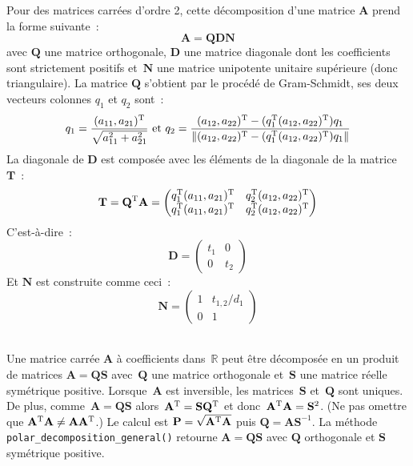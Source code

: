 \documentclass[11pt]{article}
\newcommand{\R}{\mathbf{\mathds{R}}}
\newcommand{\mb}[1]{\mathbf{#1}}
\let\mathds\mathbb
\begin{document}
\begin{description}[leftmargin=4cm, style=nextline]
\item[\texttt{iwasawa()}] 
Pour des matrices carr\'ees d'ordre 2, cette d\'ecomposition d'une matrice $\mb{A}$ prend la forme suivante~:
$$\mb{A} = \mb{Q}\mb{D}\mb{N}$$
avec $\mb{Q}$ une matrice orthogonale, $\mb{D}$ une matrice diagonale dont les coefficients sont strictement positifs et~$\mb{N}$ une matrice unipotente unitaire sup\'erieure (donc triangulaire).
La matrice $\mb{Q}$ s'obtient par le proc\'ed\'e de Gram-Schmidt, ses deux vecteurs colonnes $q_1$ et $q_2$ sont~:
$$q_1 = \dfrac{(a_{11},a_{21})^{\textsc{T}}}{\sqrt{a_{11}^2+a_{21}^2}} \text{ et } q_2 = \dfrac{(a_{12},a_{22})^{\textsc{T}}-(q_1^{\textsc{T}}(a_{12},a_{22})^{\textsc{T}})q_1}{\|(a_{12},a_{22})^{\textsc{T}}-(q_1^{\textsc{T}}(a_{12},a_{22})^{\textsc{T}})q_1\|}$$
La diagonale de $\mb{D}$ est compos\'ee avec les \'el\'ements de la diagonale de la matrice~$\mb{T}$~:
$$\mb{T} = \mb{Q}^{\textsc{T}}\mb{A} = \begin{pmatrix}q_1^{\textsc{T}}(a_{11},a_{21})^{\textsc{T}} & q_2^{\textsc{T}}(a_{12},a_{22})^{\textsc{T}} \\ q_1^{\textsc{T}}(a_{11},a_{21})^{\textsc{T}} & q_2^{\textsc{T}}(a_{12},a_{22})^{\textsc{T}}\end{pmatrix}$$
C'est-\`a-dire~:
$$\mb{D} = \begin{pmatrix} t_1 & 0 \\ 0 & t_2\end{pmatrix}$$
Et $\mb{N}$ est construite comme ceci~:
$$\mb{N} = \begin{pmatrix} 1 &t_{1,2}/d_1 \\ 0 & 1\end{pmatrix}$$\\

\item[\texttt{polar\_decomposition()}] 
Une matrice carr\'ee $\mb{A}$ \`a coefficients dans~$\R$ peut \^etre d\'ecompos\'ee en un produit de matrices $\mb{A}=\mb{Q}\mb{S}$ avec~$\mb{Q}$ une matrice orthogonale et~$\mb{S}$ une matrice r\'eelle sym\'etrique positive.
Lorsque~$\mb{A}$ est inversible, les matrices~$\mb{S}$ et~$\mb{Q}$ sont uniques. De plus, comme~$\mb{A}=\mb{Q}\mb{S}$ alors~$\mb{A}^{\textsc{T}}=\mb{S}\mb{Q}^{\textsc{T}}$ et donc~$\mb{A}^{\textsc{T}}\mb{A} = \mb{S}^{2}$.
(Ne pas omettre que $\mb{A}^{\textsc{T}}\mb{A}\neq\mb{A}\mb{A}^{\textsc{T}}$.) Le calcul est $\mb{P} = \sqrt{\mb{A}^{\textsc{T}}\mb{A}}$ puis $\mb{Q} = \mb{A}\mb{S}^{-1}$.
La m\'ethode \texttt{polar\_decomposition\_general()} retourne $\mb{A} = \mb{Q}\mb{S}$ avec $\mb{Q}$ orthogonale et $\mb{S}$ symétrique positive.\\
\end{description}
\end{document}
